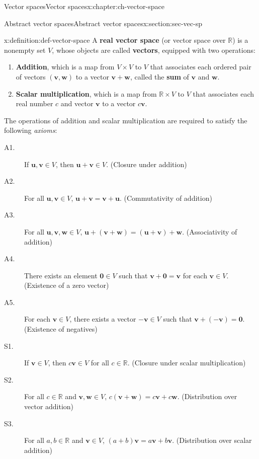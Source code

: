 \documentclass[oneside,10pt,]{book}
\newcommand{\terminology}[1]{\textbf{#1}}
\numberwithin{equation}{section}
\newcommand{\R}{\mathbb{R}}
\newcommand{\uu}{\mathbf{u}}
\newcommand{\vv}{\mathbf{v}}
\newcommand{\ww}{\mathbf{w}}
\newcommand{\zer}{\mathbf{0}}
\begin{document}
\begin{chapterptx}{Vector spaces}{}{Vector spaces}{}{}{x:chapter:ch-vector-space}
\begin{introduction}{}
\end{introduction}%
%
%
\typeout{************************************************}
\typeout{************************************************}
%
\begin{sectionptx}{Abstract vector spaces}{}{Abstract vector spaces}{}{}{x:section:sec-vec-sp}
\begin{definition}{}{x:definition:def-vector-space}%
A \terminology{real vector space} (or vector space over \(\R\)) is a nonempty set \(V\), whose objects are called \terminology{vectors}, equipped with two operations:%
\begin{enumerate}
\item{}\terminology{Addition}, which is a map from \(V\times V\) to \(V\) that associates each ordered pair of vectors \((\vv,\ww)\) to a vector \(\vv+\ww\), called the \terminology{sum} of \(\vv\) and \(\ww\).%
\item{}\terminology{Scalar multiplication}, which is a map from \(\R\times V\) to \(V\) that associates each real number \(c\) and vector \(\vv\) to a vector \(c\vv\).%
\end{enumerate}
%
\par
The operations of addition and scalar multiplication are required to satisfy the following \emph{axioms}:%
\begin{description}
\item[{A1.}]If \(\uu,\vv\in V\), then \(\uu+\vv\in V\). (Closure under addition)%
\item[{A2.}]For all \(\uu,\vv\in V\), \(\uu+\vv=\vv+\uu\). (Commutativity of addition)%
\item[{A3.}]For all \(\uu,\vv,\ww\in V\), \(\uu+(\vv+\ww)=(\uu+\vv)+\ww\). (Associativity of addition)%
\item[{A4.}]There exists an element \(\zer\in V\) such that \(\vv+\zer=\vv\) for each \(\vv\in V\). (Existence of a zero vector)%
\item[{A5.}]For each \(\vv\in V\), there exists a vector \(-\vv\in V\) such that \(\vv+(-\vv)=\zer\). (Existence of negatives)%
\item[{S1.}]If \(\vv\in V\), then \(c\vv\in V\) for all \(c\in\R\). (Closure under scalar multiplication)%
\item[{S2.}]For all \(c\in \R\) and \(\vv,\ww\in V\), \(c(\vv+\ww)=c\vv+c\ww\). (Distribution over vector addition)%
\item[{S3.}]For all \(a,b\in\R\) and \(\vv\in V\), \((a+b)\vv=a\vv+b\vv\). (Distribution over scalar addition)%

\end{description}
\end{definition}
\end{sectionptx}
\end{chapterptx}
\end{document}
